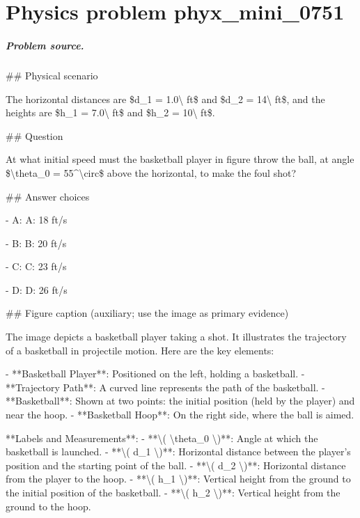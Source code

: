 
\chapter{Physics problem phyx\_mini\_0751}
\label{ch:PhyXMiniProblems_problem_phyx_mini_0751}

\paragraph{Problem source.}
\#\# Physical scenario

The horizontal distances are \$d\_1 = 1.0\textbackslash{} ft\$ and \$d\_2 = 14\textbackslash{} ft\$, and the heights are \$h\_1 = 7.0\textbackslash{} ft\$ and \$h\_2 = 10\textbackslash{} ft\$.

\#\# Question

At what initial speed must the basketball player in figure throw the ball, at angle \$\textbackslash{}theta\_0 = 55\textasciicircum{}\textbackslash{}circ\$ above the horizontal, to make the foul shot?

\#\# Answer choices

- A: A: 18 ft/s

- B: B: 20 ft/s

- C: C: 23 ft/s

- D: D: 26 ft/s

\#\# Figure caption (auxiliary; use the image as primary evidence)

The image depicts a basketball player taking a shot. It illustrates the trajectory of a basketball in projectile motion. Here are the key elements:

- **Basketball Player**: Positioned on the left, holding a basketball.
- **Trajectory Path**: A curved line represents the path of the basketball.
- **Basketball**: Shown at two points: the initial position (held by the player) and near the hoop.
- **Basketball Hoop**: On the right side, where the ball is aimed.
  
**Labels and Measurements**:
- **\textbackslash{}( \textbackslash{}theta\_0 \textbackslash{})**: Angle at which the basketball is launched.
- **\textbackslash{}( d\_1 \textbackslash{})**: Horizontal distance between the player’s position and the starting point of the ball.
- **\textbackslash{}( d\_2 \textbackslash{})**: Horizontal distance from the player to the hoop.
- **\textbackslash{}( h\_1 \textbackslash{})**: Vertical height from the ground to the initial position of the basketball.
- **\textbackslash{}( h\_2 \textbackslash{})**: Vertical height from the ground to the hoop.


